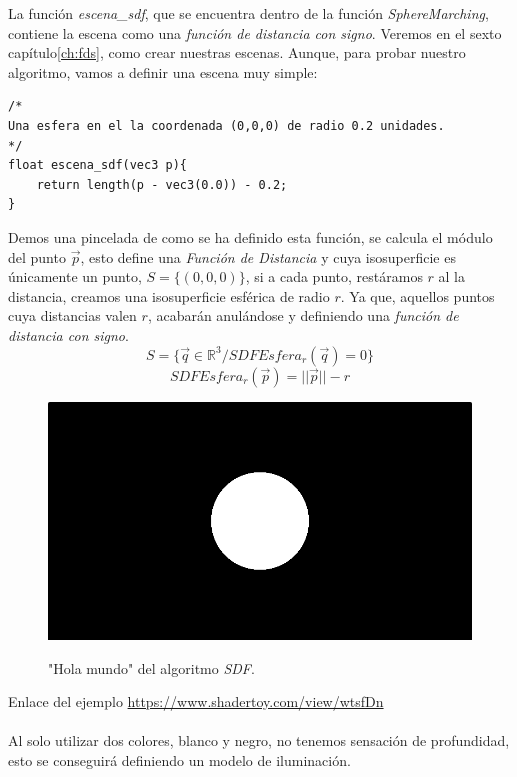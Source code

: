 \newpage
La función \textit{escena\_sdf}, que se encuentra dentro de la función \textit{SphereMarching}, contiene la escena como una \textit{función de distancia con signo}. Veremos en el sexto capítulo\ref{ch:fds}, como crear nuestras escenas. Aunque, para probar nuestro algoritmo, vamos a definir una escena muy simple:
\begin{lstlisting}
/* 
Una esfera en el la coordenada (0,0,0) de radio 0.2 unidades.
*/
float escena_sdf(vec3 p){
    return length(p - vec3(0.0)) - 0.2;
}
\end{lstlisting}
Demos una pincelada de como se ha definido esta función, se calcula el módulo del punto \(\Vec{p}\), esto define una \textit{Función de Distancia} y cuya isosuperficie es únicamente un punto, \(S=\{(0,0,0)\}\), si a cada punto, restáramos \(r\) al la distancia, creamos una isosuperficie esférica de radio \(r\). Ya que, aquellos puntos cuya distancias valen \(r\), acabarán anulándose y definiendo una \textit{función de distancia con signo}.
\[S=\{\Vec{q} \in \mathbb{R}^3 / SDFEsfera_r(\Vec{q})=0\}\]
\[ SDFEsfera_r(\Vec{p})=\vert\vert\Vec{p}\vert\vert - r  \]
\begin{figure}[H]
  \centering
  \captionsetup{justification=centering}%
  \includegraphics[width=1.0\textwidth]{secciones/imagenes/starting/sdf1.png}\label{fig:hello}
  \caption{"Hola mundo" del algoritmo \textit{SDF}.}
\end{figure}

Enlace del ejemplo \url{https://www.shadertoy.com/view/wtsfDn}\\\\
Al solo utilizar dos colores, blanco y negro, no tenemos sensación de profundidad, esto se conseguirá definiendo un modelo de iluminación.